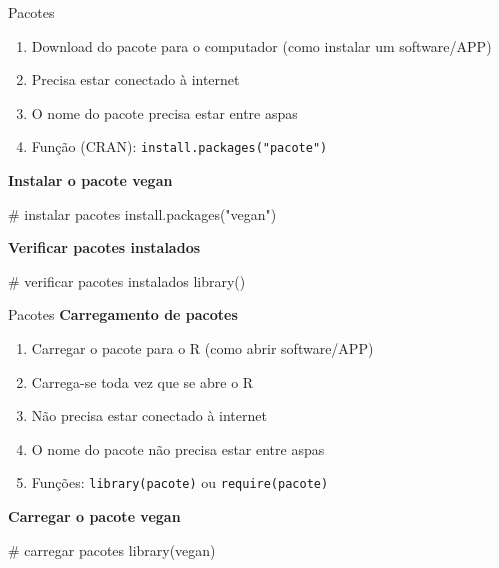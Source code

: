 \documentclass[
  ignorenonframetext,
]{beamer}
\newenvironment{Shaded}{\begin{snugshade}}{\end{snugshade}}
\newcommand{\CommentTok}[1]{\textcolor[rgb]{0.37,0.37,0.37}{#1}}
\newcommand{\FunctionTok}[1]{\textcolor[rgb]{0.28,0.35,0.67}{#1}}
\newcommand{\NormalTok}[1]{\textcolor[rgb]{0.00,0.23,0.31}{#1}}
\newcommand{\StringTok}[1]{\textcolor[rgb]{0.13,0.47,0.30}{#1}}
\providecommand{\tightlist}{%
  \setlength{\itemsep}{0pt}\setlength{\parskip}{0pt}}\usepackage{longtable,booktabs,array}
\begin{document}
\begin{frame}[fragile]
\begin{block}{Pacotes}
\begin{enumerate}
\tightlist
\item
  Download do pacote para o computador (como instalar um software/APP)
\item
  Precisa estar conectado à internet
\item
  O nome do pacote precisa estar entre aspas
\item
  Função (CRAN): \texttt{install.packages("pacote")}
\end{enumerate}

\textbf{Instalar o pacote vegan}

\begin{Shaded}
\begin{Highlighting}[]
\CommentTok{\# instalar pacotes}
\FunctionTok{install.packages}\NormalTok{(}\StringTok{"vegan"}\NormalTok{)}
\end{Highlighting}
\end{Shaded}

\textbf{Verificar pacotes instalados}

\begin{Shaded}
\begin{Highlighting}[]
\CommentTok{\# verificar pacotes instalados}
\FunctionTok{library}\NormalTok{()}
\end{Highlighting}
\end{Shaded}
\end{block}

\begin{block}{Pacotes}
\protect\hypertarget{pacotes-3}{}
\textbf{Carregamento de pacotes}

\begin{enumerate}
\tightlist
\item
  Carregar o pacote para o R (como abrir software/APP)
\item
  Carrega-se toda vez que se abre o R
\item
  Não precisa estar conectado à internet
\item
  O nome do pacote não precisa estar entre aspas
\item
  Funções: \texttt{library(pacote)} ou \texttt{require(pacote)}
\end{enumerate}

\textbf{Carregar o pacote vegan}

\begin{Shaded}
\begin{Highlighting}[]
\CommentTok{\# carregar pacotes}
\FunctionTok{library}\NormalTok{(vegan)}
\end{Highlighting}
\end{Shaded}


\end{block}
\end{frame}
\end{document}
